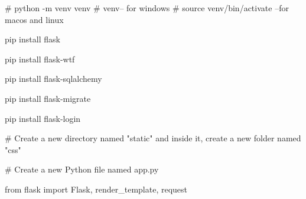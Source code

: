 # python -m venv venv  
# venv\Scripts\activate -- for windows
# source venv/bin/activate --for macos and linux

pip install flask

pip install flask-wtf

pip install flask-sqlalchemy

pip install flask-migrate

pip install flask-login

# Create a new directory named "static" and inside it, create a new folder named "css"

# Create a new Python file named app.py

from flask import Flask, render_template, request 